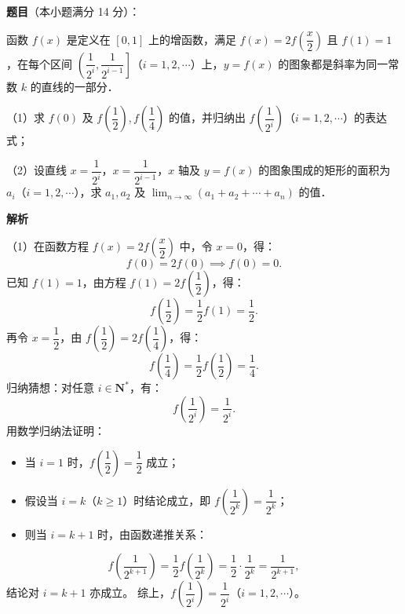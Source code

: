 \begin{answer}

\textbf{题目}（本小题满分 14 分）：

函数 $f(x)$ 是定义在 $[0, 1]$ 上的增函数，满足 $f(x)=2f\left(\dfrac{x}{2}\right)$ 且 $f(1)=1$，在每个区间 $\left(\dfrac{1}{2^i}, \dfrac{1}{2^{i-1}}\right]$（$i=1, 2, \cdots$）上，$y=f(x)$ 的图象都是斜率为同一常数 $k$ 的直线的一部分．

（1）求 $f(0)$ 及 $f\left(\dfrac{1}{2}\right), f\left(\dfrac{1}{4}\right)$ 的值，并归纳出 $f\left(\dfrac{1}{2^i}\right)$（$i=1, 2, \cdots$）的表达式；

（2）设直线 $x=\dfrac{1}{2^i}$，$x=\dfrac{1}{2^{i-1}}$，$x$ 轴及 $y=f(x)$ 的图象围成的矩形的面积为 $a_i$（$i=1, 2, \cdots$），求 $a_1, a_2$ 及 $\lim_{n\to\infty}(a_1+a_2+\cdots+a_n)$ 的值．

\textbf{解析}

（1）在函数方程 $f(x)=2f\left(\dfrac{x}{2}\right)$ 中，令 $x=0$，得：
\nopagebreak[4]
\[
f(0)=2f(0)\implies f(0)=0.
\]
已知 $f(1)=1$，由方程 $f(1)=2f\left(\dfrac{1}{2}\right)$，得：
\nopagebreak[4]
\[
f\left(\frac{1}{2}\right)=\frac{1}{2}f(1)=\frac{1}{2}.
\]
再令 $x=\dfrac{1}{2}$，由 $f\left(\dfrac{1}{2}\right)=2f\left(\dfrac{1}{4}\right)$，得：
\nopagebreak[4]
\[
f\left(\frac{1}{4}\right)=\frac{1}{2}f\left(\frac{1}{2}\right)=\frac{1}{4}.
\]
归纳猜想：对任意 $i\in\mathbf{N}^*$，有：
\nopagebreak[4]
\[
f\left(\frac{1}{2^i}\right)=\frac{1}{2^i}.
\]
用数学归纳法证明：
\begin{itemize}
\item 当 $i=1$ 时，$f\left(\dfrac{1}{2}\right)=\dfrac{1}{2}$ 成立；
\item 假设当 $i=k$（$k\ge 1$）时结论成立，即 $f\left(\dfrac{1}{2^k}\right)=\dfrac{1}{2^k}$；
\item 则当 $i=k+1$ 时，由函数递推关系：
\end{itemize}
\nopagebreak[4]
\[
f\left(\frac{1}{2^{k+1}}\right)=\frac{1}{2}f\left(\frac{1}{2^k}\right)=\frac{1}{2}\cdot\frac{1}{2^k}=\frac{1}{2^{k+1}},
\]
结论对 $i=k+1$ 亦成立。
综上，$f\left(\dfrac{1}{2^i}\right)=\dfrac{1}{2^i}$（$i=1, 2, \cdots$）。


\end{answer}
